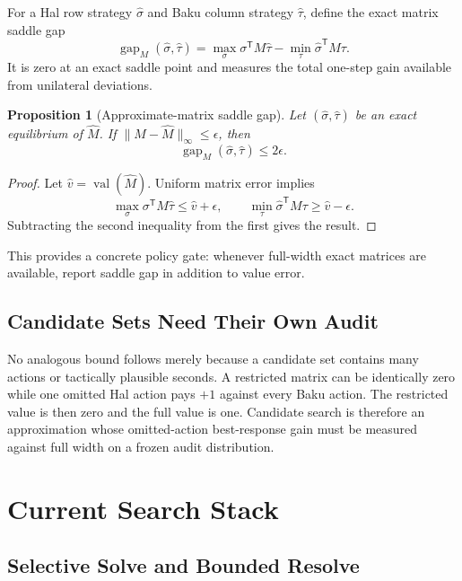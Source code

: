 \documentclass[11pt]{article}
\newtheorem{proposition}{Proposition}
\newcommand{\val}{\operatorname{val}}
\newcommand{\gap}{\operatorname{gap}}
\begin{document}
For a Hal row strategy \(\widehat\sigma\) and Baku column strategy
\(\widehat\tau\), define the exact matrix saddle gap
\[
\gap_M(\widehat\sigma,\widehat\tau)
=
\max_{\sigma}\sigma^{\mathsf T}M\widehat\tau
-
\min_{\tau}\widehat\sigma^{\mathsf T}M\tau.
\]
It is zero at an exact saddle point and measures the total one-step gain
available from unilateral deviations.

\begin{proposition}[Approximate-matrix saddle gap]
Let \((\widehat\sigma,\widehat\tau)\) be an exact equilibrium of
\(\widehat M\). If
\(\lVert M-\widehat M\rVert_{\infty}\le\epsilon\), then
\[
\gap_M(\widehat\sigma,\widehat\tau)\le2\epsilon.
\]
\end{proposition}

\begin{proof}
Let \(\widehat v=\val(\widehat M)\). Uniform matrix error implies
\[
\max_{\sigma}\sigma^{\mathsf T}M\widehat\tau
\le \widehat v+\epsilon,
\qquad
\min_{\tau}\widehat\sigma^{\mathsf T}M\tau
\ge \widehat v-\epsilon.
\]
Subtracting the second inequality from the first gives the result.
\end{proof}

This provides a concrete policy gate: whenever full-width exact matrices are
available, report saddle gap in addition to value error.

\subsection{Candidate Sets Need Their Own Audit}

No analogous bound follows merely because a candidate set contains many
actions or tactically plausible seconds. A restricted matrix can be identically
zero while one omitted Hal action pays \(+1\) against every Baku action. The
restricted value is then zero and the full value is one. Candidate search is
therefore an approximation whose omitted-action best-response gain must be
measured against full width on a frozen audit distribution.

\section{Current Search Stack}

\subsection{Selective Solve and Bounded Resolve}
\end{document}
